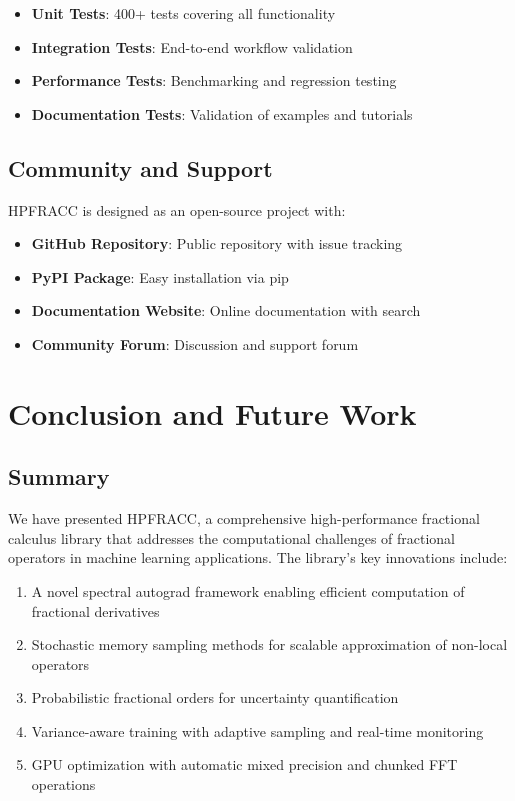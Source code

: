 \documentclass[12pt]{article}
\begin{document}
\begin{itemize}
\item \textbf{Unit Tests}: 400+ tests covering all functionality
\item \textbf{Integration Tests}: End-to-end workflow validation
\item \textbf{Performance Tests}: Benchmarking and regression testing
\item \textbf{Documentation Tests}: Validation of examples and tutorials
\end{itemize}

\subsection{Community and Support}

HPFRACC is designed as an open-source project with:

\begin{itemize}
\item \textbf{GitHub Repository}: Public repository with issue tracking
\item \textbf{PyPI Package}: Easy installation via pip
\item \textbf{Documentation Website}: Online documentation with search
\item \textbf{Community Forum}: Discussion and support forum
\end{itemize}

\section{Conclusion and Future Work}

\subsection{Summary}

We have presented HPFRACC, a comprehensive high-performance fractional calculus library that addresses the computational challenges of fractional operators in machine learning applications. The library's key innovations include:

\begin{enumerate}
\item A novel spectral autograd framework enabling efficient computation of fractional derivatives
\item Stochastic memory sampling methods for scalable approximation of non-local operators
\item Probabilistic fractional orders for uncertainty quantification
\item Variance-aware training with adaptive sampling and real-time monitoring
\item GPU optimization with automatic mixed precision and chunked FFT operations
\end{enumerate}
\end{document}
